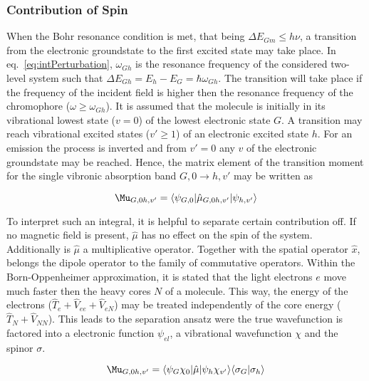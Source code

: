 			\subsubsection{Contribution of Spin}
			When the Bohr resonance condition is met, that being $\Delta E_{Gm} \leq h\nu$, a transition from the electronic groundstate to the first excited state may take place. In eq.~\ref{eq:intPerturbation}, $\omega_{Gh}$ is the resonance frequency of the considered two-level system such that $\Delta E_{Gh} = E_h - E_G = \hbar\omega_{Gh}$. The transition will take place if the frequency of the incident field is higher then the resonance frequency of the chromophore ($\omega \geq \omega_{Gh}$). It is assumed that the molecule is initially in its vibrational lowest state ($v=0$) of the lowest electronic state $G$. A transition may reach vibrational excited states ($v'\geq 1$) of an electronic excited state $h$. For an emission the process is inverted and from $v'=0$ any $v$ of the electronic groundstate may be reached. Hence, the matrix element of the transition moment for the single vibronic absorption band $G,0 \to h,v'$ may be written as

			\begin{equation} 
				\label{eq:transitionMoment}
				\Mu_{G,0 h,v'} = \langle \psi_{G,0}|\hat{\mu}_{G,0 h,v'}|\psi_{h,v'}\rangle
			\end{equation}

			To interpret such an integral, it is helpful to separate certain contribution off. If no magnetic field is present, $\hat{\mu}$ has no effect on the spin of the system. Additionally is $\hat{\mu}$ a multiplicative operator. Together with the spatial operator $\hat{x}$, belongs the dipole operator to the family of commutative operators. Within the Born-Oppenheimer approximation, it is stated that the light electrons $e$ move much faster then the heavy cores $N$ of a molecule. This way, the energy of the electrons ($\hat{T}_e + \hat{V}_{ee} + \hat{V}_{eN}$) may be treated independently of the core energy ($\hat{T}_N + \hat{V}_{NN}$). This leads to the separation ansatz were the true wavefunction is factored into a electronic function $\psi_{el}$, a vibrational wavefunction $\chi$ and the spinor $\sigma$.

			\begin{equation}%
				\label{eq:multRule}
				\Mu_{G,0 h,v'} = \langle \psi_{G}\chi_0|\hat{\mu}|\psi_{h}\chi_{v'}\rangle\langle\sigma_{G}|\sigma_{h}\rangle
			\end{equation} 

